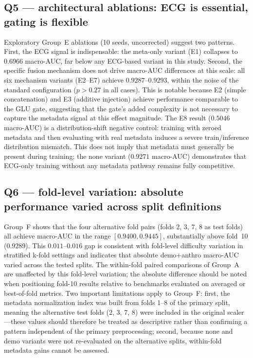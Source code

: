 \documentclass[mathematics,article,pdftex]{Definitions/mdpi}
\def\texttt#1{#1}%
\begin{document}
\subsection{Q5 --- architectural ablations: ECG is essential, gating is flexible}
Exploratory Group~E ablations (10 seeds, uncorrected) suggest two patterns. First, the ECG signal is indispensable: the meta-only variant (E1) collapses to $0.6966$ macro-AUC, far below any ECG-based variant in this study. Second, the specific fusion mechanism does not drive macro-AUC differences at this scale: all six mechanism variants (E2--E7) achieve $0.9287$--$0.9293$, within the noise of the standard configuration ($p{>}0.27$ in all cases). This is notable because E2 (simple concatenation) and E3 (additive injection) achieve performance comparable to the GLU gate, suggesting that the gate's added complexity is not necessary to capture the metadata signal at this effect magnitude. The E8 result ($0.5046$ macro-AUC) is a distribution-shift negative control: training with zeroed metadata and then evaluating with real metadata induces a severe train/inference distribution mismatch. This does not imply that metadata must generally be present during training; the \texttt{none} variant ($0.9271$ macro-AUC) demonstrates that ECG-only training without any metadata pathway remains fully competitive.

\subsection{Q6 --- fold-level variation: absolute performance varied across split definitions}
Group~F shows that the four alternative fold pairs (folds 2, 3, 7, 8 as test folds) all achieve macro-AUC in the range $[0.9400, 0.9445]$, substantially above fold~10 ($0.9289$). This $0.011$--$0.016$ gap is consistent with fold-level difficulty variation in stratified k-fold settings and indicates that absolute \texttt{demo+anthro} macro-AUC varied across the tested splits. The within-fold paired comparisons of Group~A are unaffected by this fold-level variation; the absolute difference should be noted when positioning fold-10 results relative to benchmarks evaluated on averaged or best-of-fold metrics. Two important limitations apply to Group~F: first, the metadata normalization index was built from folds 1--8 of the primary split, meaning the alternative test folds (2, 3, 7, 8) were included in the original scaler---these values should therefore be treated as descriptive rather than confirming a pattern independent of the primary preprocessing; second, because \texttt{none} and \texttt{demo} variants were not re-evaluated on the alternative splits, within-fold metadata gains cannot be assessed.
\end{document}
